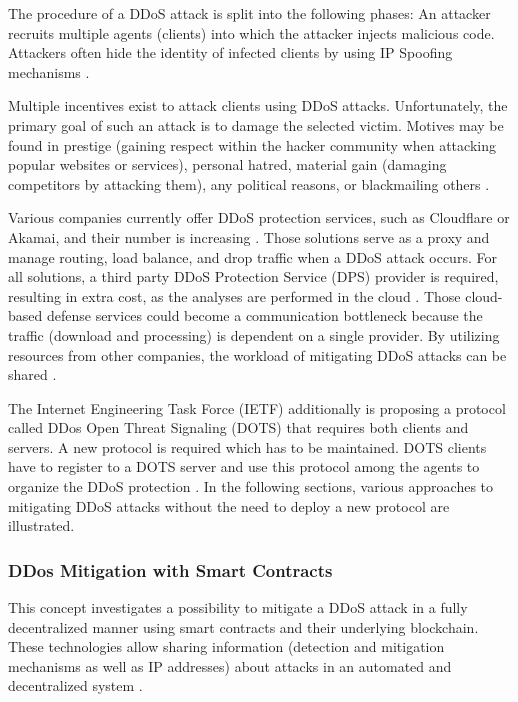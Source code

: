 The procedure of a DDoS attack is split into the following phases: An attacker recruits multiple agents (clients) into which the attacker injects malicious code. Attackers often hide the identity of infected clients by using IP Spoofing mechanisms \cite{Mirkovic2004}.


Multiple incentives exist to attack clients using DDoS attacks. Unfortunately, the primary goal of such an attack is to damage the selected victim. Motives may be found in prestige (gaining respect within the hacker community when attacking popular websites or services), personal hatred, material gain (damaging competitors by attacking them), any political reasons, or blackmailing others \cite{Mansfield-Devine2015, Mirkovic2004}.

Various companies currently offer DDoS protection services, such as Cloudflare or Akamai, and their number is increasing \cite{Pras2016}. Those solutions serve as a proxy and manage routing, load balance, and drop traffic when a DDoS attack occurs. For all solutions, a third party DDoS Protection Service (DPS) provider is required, resulting in extra cost, as the analyses are performed in the cloud \cite{Rodrigues2017}. Those cloud-based defense services could become a communication bottleneck because the traffic (download and processing) is dependent on a single provider. By utilizing resources from other companies, the workload of mitigating DDoS attacks can be shared \cite{Rodrigues2017}.

The Internet Engineering Task Force (IETF) additionally is proposing a protocol called DDos Open Threat Signaling (DOTS) that requires both clients and servers. A new protocol is required which has to be maintained. DOTS clients have to register to a DOTS server and use this protocol among the agents to organize the DDoS protection \cite{Rodrigues2017}. In the following sections, various approaches to mitigating DDoS attacks without the need to deploy a new protocol are illustrated.

\subsubsection{DDos Mitigation with Smart Contracts}
This concept investigates a possibility to mitigate a DDoS attack in a fully decentralized manner using smart contracts and their underlying blockchain. These technologies allow sharing information (detection and mitigation mechanisms as well as IP addresses) about attacks in an automated and decentralized system \cite{Rodrigues2017}.

